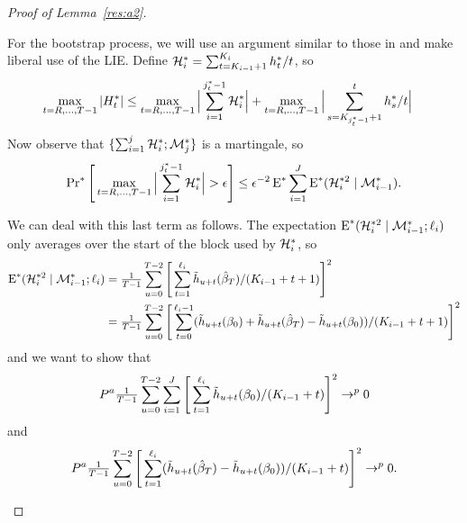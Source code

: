 \documentclass[12pt,fleqn]{article}
\begin{document}
\begin{proof}[Proof of Lemma~\ref{res:a2}]
\begin{enumerate}
    For the bootstrap process, we will use an argument similar to
    those in \cite{Cal:14} and make liberal use of the
    LIE. Define $\mathcal{H}_i^* = \sum_{t=K_{i-1}+1}^{K_i}
    h_t^*/t$, so
    \begin{align*}
      \max_{t=R,\dots,T-1} | H_t^* |
      &\leq \max_{t=R,\dots,T-1} \Big| \sum_{i=1}^{j^*_t - 1}\mathcal{H}_i^* \Big| + \max_{t=R,\dots,T-1} \Big|\sum_{s=K_{j^*_t - 1}+1}^t h_s^*/t \Big|
    \end{align*}
    Now observe that $\{\sum_{i=1}^j \mathcal{H}_i^*; \mathcal{M}_j^*\}$ is a martingale, so
    \begin{equation*}
      \operatorname{Pr}^*\Bigg[ \max_{t=R,\dots,T-1} \Big| \sum_{i=1}^{j^*_t - 1}\mathcal{H}_i^* \Big| > \epsilon \Bigg]
      \leq \epsilon^{-2} \operatorname{E}^* \sum_{i=1}^J \operatorname{E}^*(\mathcal{H}_i^{*2} \mid \mathcal{M}_{i-1}^*).
    \end{equation*}

    We can deal with this last term as follows. The expectation
    $\operatorname{E}^*(\mathcal{H}_i^{*2} \mid \mathcal{M}_{i-1}^*; \ell_i)$ only averages over the
    start of the block used by $\mathcal{H}_i^*$, so
    \begin{align*}
      \E^*(\Hs_i^{*2} \mid \Ms_{i-1}^*; \ell_i)
      &= \tfrac{1}{T-1} \sum_{u = 0}^{T-2} \Bigg[\sum_{t = 1}^{\ell_{i}} \tilde{h}_{u + t}(\btrue[*]) / (K_{i-1} + t + 1)\Bigg]^2 \\
      &= \tfrac{1}{T-1} \sum_{u = 0}^{T-2} \Bigg[\sum_{t = 0}^{\ell_{i}-1}
      (\tilde{h}_{u + t}(\btrue) + \tilde{h}_{u + t}(\btrue[*]) - \tilde{h}_{u + t}(\btrue))/ (K_{i-1} + t + 1)\Bigg]^2
    \end{align*}
    and we want to show that
    \begin{equation}\label{eq:4}
      P^a \tfrac{1}{T-1} \sum_{u = 0}^{T-2} \sum_{i=1}^J \Bigg[\sum_{t = 1}^{\ell_{i}}
      \tilde{h}_{u + t}(\btrue)/ (K_{i-1} + t)\Bigg]^2 \to^p 0
    \end{equation}
    and
    \begin{equation}\label{eq:5}
      P^a \tfrac{1}{T-1} \sum_{u = 0}^{T-2} \Bigg[\sum_{t = 1}^{\ell_{i}}
      (\tilde{h}_{u + t}(\btrue[*]) - \tilde{h}_{u + t}(\btrue))/ (K_{i-1} + t)\Bigg]^2
      \to^p 0.
    \end{equation}


\end{enumerate}
\end{proof}
\end{document}
